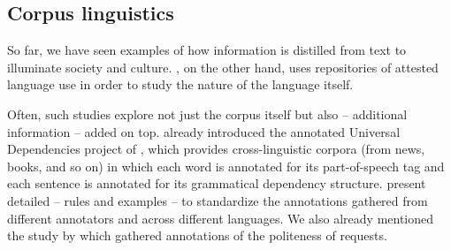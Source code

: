 \subsection{Corpus linguistics}



    

So far, we have seen examples of how information is distilled from text to illuminate society and culture. , on the
other hand, uses repositories of attested language use in order to study the nature of the language itself.  

Often, such studies explore not just the corpus itself but also  -- additional information -- added on top.    already introduced the annotated Universal Dependencies project of \citet{Nivre-etal:2016}, which provides cross-linguistic corpora (from news, books, and so on) in which each word is annotated for its part-of-speech tag and each sentence is annotated for its grammatical dependency structure.  \citet{Nivre-etal:2016}  present detailed  -- rules and examples -- to standardize the annotations gathered from different annotators and across different languages.  We also already mentioned the study by \citet{Danescu-etal:2013} which gathered annotations of the politeness of requests.

